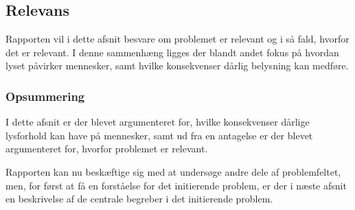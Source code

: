 \subsection{Relevans}
Rapporten vil i dette afsnit besvare om problemet er relevant og i så fald, hvorfor det er relevant. I denne sammenhæng ligges der blandt andet fokus på hvordan lyset påvirker mennesker, samt hvilke konsekvenser dårlig belysning kan medføre. 





\subsubsection*{Opsummering}
I dette afsnit er der blevet argumenteret for, hvilke konsekvenser dårlige lysforhold kan have på mennesker, samt ud fra en antagelse er der blevet argumenteret for, hvorfor problemet er relevant. 

Rapporten kan nu beskæftige sig med at undersøge andre dele af problemfeltet, men, for først at få en forståelse for det initierende problem, er der i næste afsnit en beskrivelse af de centrale begreber i det initierende problem.
